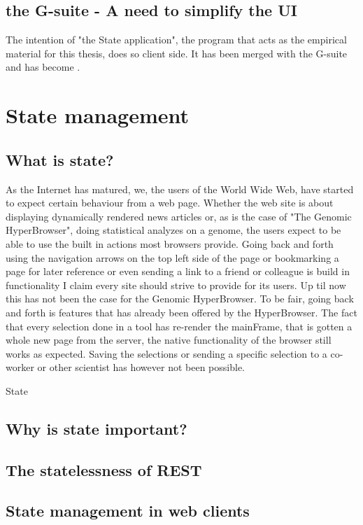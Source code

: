 \documentclass[english]{ifimaster}
\begin{document}
\subsection{the G-suite - A need to simplify the UI}
The intention of "the State application", the program that acts as the empirical material for this thesis, does so client side. It has been merged with the G-suite and has become .
\section{State management}
\subsection{What is state?}

As the Internet has matured, we, the users of the World Wide Web, have started to expect certain behaviour from a web page\parencite[p.85]{mikowski}. Whether the web site is about displaying dynamically rendered news articles or, as is the case of "The Genomic HyperBrowser", doing statistical analyzes on a genome, the users expect to be able to use the built in actions most browsers provide. Going back and forth using the navigation arrows on the top left side of the page or bookmarking a page for later reference or even sending a link to a friend or colleague is build in functionality I claim every site should strive to provide for its users.\newline
\noindent Up til now this has not been the case for the Genomic HyperBrowser. To be fair, going back and forth is features that has already been offered by the HyperBrowser. The fact that every selection done in a tool has re-render the mainFrame, that is gotten a whole new page from the server, the native functionality of the browser still works as expected. Saving the selections or sending a specific selection to a co-worker or other scientist has however not been possible.

State

\subsection{Why is state important?}

\subsection{The statelessness of REST}

\subsection{State management in web clients}
\end{document}
